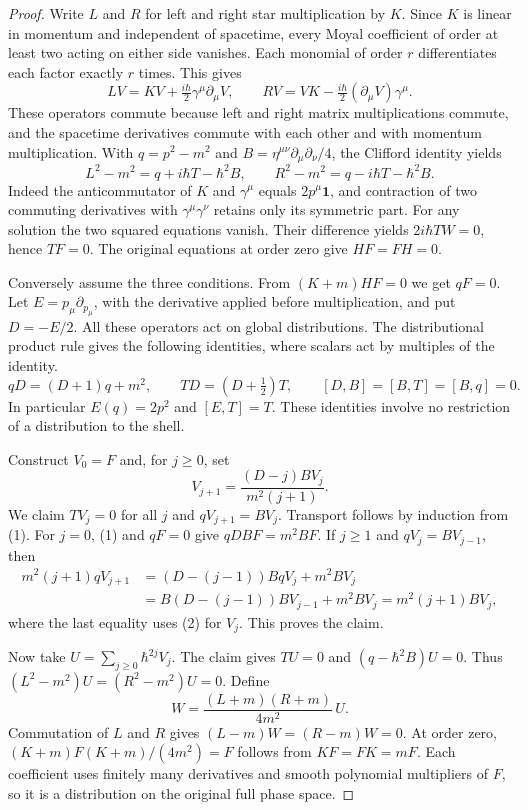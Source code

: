 \documentclass[11pt]{article}
\newcommand{\id}{\mathbf 1}
\newcommand{\dd}{\partial}
\begin{document}
\begin{proof}
Write $L$ and $R$ for left and right star multiplication by $K$. Since $K$ is
linear in momentum and independent of spacetime, every Moyal coefficient of order
at least two acting on either side vanishes. Each monomial of order $r$ differentiates
each factor exactly $r$ times. This gives
\[
 LV=KV+\tfrac{i\hbar}{2}\gamma^\mu\dd_\mu V,\qquad
 RV=VK-\tfrac{i\hbar}{2}(\dd_\mu V)\gamma^\mu .
\]
These operators commute because left and right matrix multiplications commute,
and the spacetime derivatives commute with each other and with momentum
multiplication. With $q=p^2-m^2$ and $B=\eta^{\mu\nu}\dd_\mu\dd_\nu/4$,
the Clifford identity yields
\[
 L^2-m^2=q+i\hbar T-\hbar^2B,\qquad
 R^2-m^2=q-i\hbar T-\hbar^2B .
\]
Indeed the anticommutator of $K$ and $\gamma^\mu$ equals $2p^\mu\id$,
and contraction of two commuting derivatives with $\gamma^\mu\gamma^\nu$
retains only its symmetric part. For any solution the two squared equations
vanish. Their difference yields $2i\hbar TW=0$, hence $TF=0$.
The original equations at order zero give $HF=FH=0$.

Conversely assume the three conditions. From $(K+m)HF=0$ we get $qF=0$.
Let $E=p_\mu\partial_{p_\mu}$, with the derivative applied before multiplication,
and put $D=-E/2$. All these operators act on global distributions. The distributional
product rule gives the following identities, where scalars act by
multiples of the identity.
\begin{equation}
 qD=(D+1)q+m^2,\qquad TD=(D+\tfrac12)T,\qquad
 [D,B]=[B,T]=[B,q]=0 .                                      \tag{1}
\end{equation}
In particular $E(q)=2p^2$ and $[E,T]=T$. These identities involve no
restriction of a distribution to the shell.

Construct $V_0=F$ and, for $j\geq0$, set
\begin{equation}
 V_{j+1}=\frac{(D-j)BV_j}{m^2(j+1)} .                       \tag{2}
\end{equation}
We claim $TV_j=0$ for all $j$ and $qV_{j+1}=BV_j$. Transport follows by
induction from (1). For $j=0$, (1) and $qF=0$ give $qDBF=m^2BF$.
If $j\geq1$ and $qV_j=BV_{j-1}$, then
\begin{align*}
 m^2(j+1)qV_{j+1}
 &= (D-(j-1))BqV_j+m^2 BV_j\\
 &= B(D-(j-1))BV_{j-1}+m^2BV_j
  =m^2(j+1)BV_j,
\end{align*}
where the last equality uses (2) for $V_j$. This proves the claim.

Now take $U=\sum_{j\geq0}\hbar^{2j}V_j$. The claim gives $TU=0$ and
$(q-\hbar^2 B)U=0$. Thus $(L^2-m^2)U=(R^2-m^2)U=0$. Define
\[
 W=\frac{(L+m)(R+m)}{4m^2}\,U .
\]
Commutation of $L$ and $R$ gives $(L-m)W=(R-m)W=0$. At order
zero, $(K+m)F(K+m)/(4m^2)=F$ follows from $KF=FK=mF$.
Each coefficient uses finitely many derivatives and smooth polynomial
multipliers of $F$, so it is a distribution on the original full phase space.
\end{proof}
\end{document}
